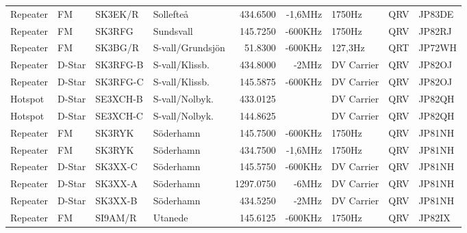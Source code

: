 \begin{landscape}
\begin{longtable}{llllrrlcl}
	Repeater          & FM           & SK3EK/R       & Sollefteå        &          434.6500 &        -1,6MHz & 1750Hz          &       QRV       & JP83DE           \\
	Repeater          & FM           & SK3RFG        & Sundsvall        &          145.7250 &        -600KHz & 1750Hz          &       QRV       & JP82RJ           \\
	Repeater          & FM           & SK3BG/R       & S-vall/Grundsjön &           51.8300 &        -600KHz & 127,3Hz         &       QRT       & JP72WH           \\
	Repeater          & D-Star       & SK3RFG-B      & S-vall/Klissb.   &          434.8000 &          -2MHz & DV Carrier      &       QRV       & JP82OJ           \\
	Repeater          & D-Star       & SK3RFG-C      & S-vall/Klissb.   &          145.5875 &        -600KHz & DV Carrier      &       QRV       & JP82OJ           \\
	Hotspot           & D-Star       & SE3XCH-B      & S-vall/Nolbyk.   &          433.0125 &                & DV Carrier      &       QRV       & JP82QH           \\
	Hotspot           & D-Star       & SE3XCH-C      & S-vall/Nolbyk.   &          144.8625 &                & DV Carrier      &       QRV       & JP82QH           \\
	Repeater          & FM           & SK3RYK        & Söderhamn        &          145.7500 &        -600KHz & 1750Hz          &       QRV       & JP81NH           \\
	Repeater          & FM           & SK3RYK        & Söderhamn        &          434.7500 &        -1,6MHz & 1750Hz          &       QRV       & JP81NH           \\
	Repeater          & D-Star       & SK3XX-C       & Söderhamn        &          145.5750 &        -600KHz & DV Carrier      &       QRV       & JP81NH           \\
	Repeater          & D-Star       & SK3XX-A       & Söderhamn        &         1297.0750 &          -6MHz & DV Carrier      &       QRV       & JP81NH           \\
	Repeater          & D-Star       & SK3XX-B       & Söderhamn        &          434.5250 &          -2MHz & DV Carrier      &       QRV       & JP81NH           \\
	Repeater          & FM           & SI9AM/R       & Utanede          &          145.6125 &        -600KHz & 1750Hz          &       QRV       & JP82IX           \\

\end{longtable}
\end{landscape}
